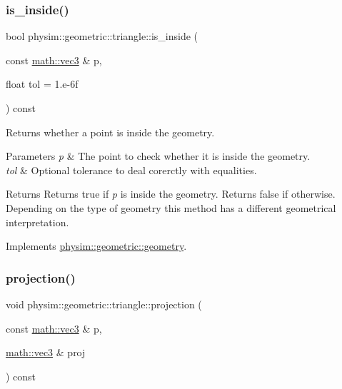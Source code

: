 \subsubsection{\texorpdfstring{is\+\_\+inside()}{is\_inside()}}
{\footnotesize\ttfamily bool physim\+::geometric\+::triangle\+::is\+\_\+inside (\begin{DoxyParamCaption}\item[{const \hyperlink{structphysim_1_1math_1_1vec3}{math\+::vec3} \&}]{p,  }\item[{float}]{tol = {\ttfamily 1.e-\/6f} }\end{DoxyParamCaption}) const\hspace{0.3cm}{\ttfamily [virtual]}}



Returns whether a point is inside the geometry. 


\begin{DoxyParams}{Parameters}
{\em p} & The point to check whether it is inside the geometry. \\
\hline
{\em tol} & Optional tolerance to deal corerctly with equalities. \\
\hline
\end{DoxyParams}
\begin{DoxyReturn}{Returns}
Returns true if {\itshape p} is inside the geometry. Returns false if otherwise. Depending on the type of geometry this method has a different geometrical interpretation. 
\end{DoxyReturn}


Implements \hyperlink{classphysim_1_1geometric_1_1geometry_a325d4049d4e14584b389a2f1202bdc08}{physim\+::geometric\+::geometry}.

\mbox{\label{classphysim_1_1geometric_1_1triangle_abf4852436b554b0a220d1edde0689845}} 
\subsubsection{\texorpdfstring{projection()}{projection()}}
{\footnotesize\ttfamily void physim\+::geometric\+::triangle\+::projection (\begin{DoxyParamCaption}\item[{const \hyperlink{structphysim_1_1math_1_1vec3}{math\+::vec3} \&}]{p,  }\item[{\hyperlink{structphysim_1_1math_1_1vec3}{math\+::vec3} \&}]{proj }\end{DoxyParamCaption}) const}



